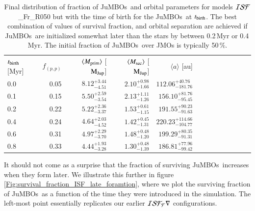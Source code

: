 \documentclass[submission,phys]{lib/SciPost}
\newcommand{\MJup}{\mbox{$\mathrm{{M}}_{\rm Jup}$}}
\newcommand{\jumbos}{\mbox{JuMBOs}}
\begin{document}
\begin{table}
  \caption{Final distribution of fraction of \jumbos\, and orbital
    parameters for models ${\cal ISF}$\_Fr\_R050 but with the time of
    birth for the \jumbos\, at $t_{\rm birth}$.  The best combination
    of values of survival fraction, and orbital separation are
    achieved if \jumbos\, are initialized somewhat later than the
    stars by between 0.2\,Myr or 0.4\,Myr.  The initial fraction of
    \jumbos\, over JMOs is typically 50\,\%.  }
 \label{Tab:late_formed_jumbos}
 \centering 
 \begin{tabular}{lrrrrrrrrrrrr}
   \hline\hline
 $t_{\rm birth}$ [Myr] & $f_{(p,p)}$  & $\langle M_{\rm prim} \rangle$ [\MJup] & $\langle M_{\rm sec} \rangle$ [\MJup] & $\langle a \rangle$ [au] \\
 0.0 & 0.05 &  $8.12^{+3.44}_{-4.51}$ & $2.10^{+0.98}_{-1.66}$ & $112.06^{+40.76}_{-181.76}$ \vspace{0.25em}\\
 0.1 & 0.15 &  $5.50^{+2.59}_{-3.54}$ & $2.13^{+1.11}_{-1.26}$ & $156.10^{+81.76}_{-95.45}$ \vspace{0.25em}\\
 0.2 & 0.22 &  $5.22^{+2.36}_{-3.37}$ & $1.53^{+0.61}_{-1.15}$ & $191.55^{+90.23}_{-91.63}$ \vspace{0.25em}\\
 0.4 & 0.24 &  $4.64^{+2.03}_{-4.52}$ & $1.42^{+0.45}_{-1.31}$ & $220.23^{+114.66}_{-104.77}$ \vspace{0.25em}\\
 0.6 & 0.31 &  $4.97^{+2.29}_{-3.70}$ & $1.48^{+0.48}_{-1.20}$ & $199.29^{+80.35}_{-91.31}$ \vspace{0.25em}\\
 0.8 & 0.33 &  $4.44^{+1.93}_{-3.28}$ & $1.30^{+0.48}_{-1.39}$ & $186.81^{+77.96}_{-99.42}$ \vspace{0.25em}\\
  \hline
 \end{tabular}
\end{table}

It should not come as a surprise that the fraction of surviving
\jumbos\, increases when they form later. We illustrate this further in
figure\,\ref{Fig:survival_fraction_ISF_late_foramtion}, where we plot
the surviving fraction of \jumbos\, as a function of the time they
were introduced in the simulation. The left-most point essentially replicates 
our earlier ${\cal ISF_Fr}$ configurations.
\end{document}
